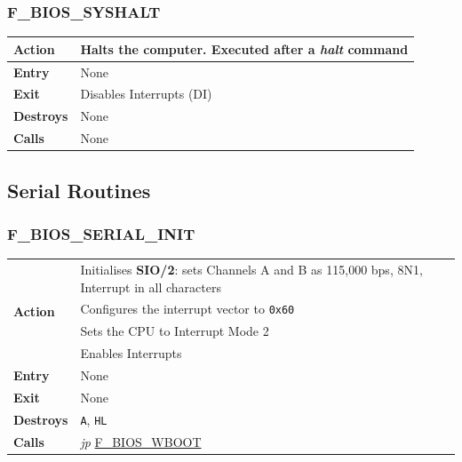 \documentclass[a4paper,11pt]{article}
\begin{document}
        \subsubsection{F\_BIOS\_SYSHALT}
        \label{func:fbiossyshalt}
        \begin{tabular}{l p{9cm}}
            \hline\textbf{Action}
            & Halts the computer. Executed after a \textit{halt} command \\
            \hline\textbf{Entry} & None \\
            \hline\textbf{Exit} & Disables Interrupts (DI) \\
            \hline\textbf{Destroys} & None \\
            \hline\textbf{Calls} & None \\
            \hline
        \end{tabular}

    \subsection{Serial Routines}

        \subsubsection{F\_BIOS\_SERIAL\_INIT}
        \label{func:fbiosserialinit}
        \begin{tabular}{l p{9cm}}
            \hline\multirow[t]{4}{4em}{\textbf{Action}}
            & Initialises \textbf{SIO/2}: sets Channels A and B as 115,000 bps, 
            8N1, Interrupt in all characters \\
            & Configures the interrupt vector to \texttt{0x60} \\
            & Sets the CPU to Interrupt Mode 2 \\
            & Enables Interrupts \\
            \hline\textbf{Entry} & None \\
            \hline\textbf{Exit} & None \\
            \hline\textbf{Destroys} & \texttt{A}, \texttt{HL} \\
            \hline\textbf{Calls} 
            & \textit{jp} \hyperref[func:fbioswboot]{F\_BIOS\_WBOOT} \\
            \hline
        \end{tabular}
        
\end{document}
